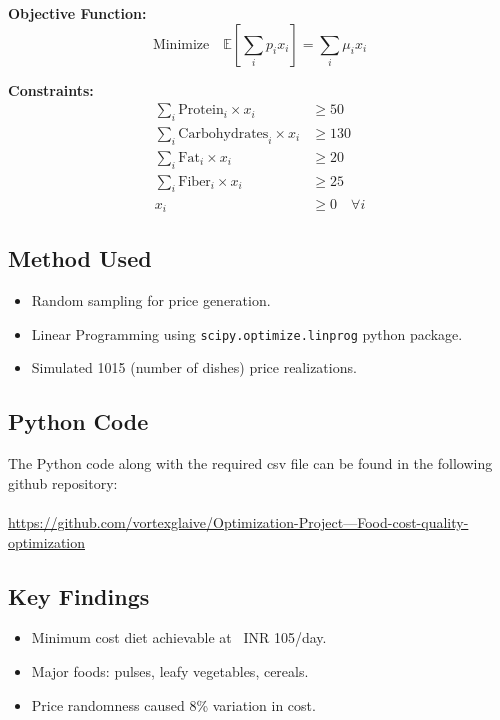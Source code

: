 \documentclass{article}
\begin{document}
\textbf{Objective Function:}
\[ \text{Minimize} \quad \mathbb{E} \left[ \sum_i p_i x_i \right] = \sum_i \mu_i x_i \]

\textbf{Constraints:}
\begin{align*}
\sum_i \text{Protein}_i \times x_i &\geq 50 \\
\sum_i \text{Carbohydrates}_i \times x_i &\geq 130 \\
\sum_i \text{Fat}_i \times x_i &\geq 20 \\
\sum_i \text{Fiber}_i \times x_i &\geq 25 \\
 x_i &\geq 0 \quad \forall i
\end{align*}

\subsection*{Method Used}
\begin{itemize}
    \item Random sampling for price generation.
    \item Linear Programming using \texttt{scipy.optimize.linprog} python package.
    \item Simulated 1015 (number of dishes) price realizations.
\end{itemize}

\subsection*{Python Code}
The Python code along with the required csv file can be found in the following github repository:\\
\\
\href{https://github.com/vortexglaive/Optimization-Project---Food-cost-quality-optimization}{https://github.com/vortexglaive/Optimization-Project---Food-cost-quality-optimization}


\subsection*{Key Findings}
\begin{itemize}
    \item Minimum cost diet achievable at ~INR 105/day.
    \item Major foods: pulses, leafy vegetables, cereals.
    \item Price randomness caused 8\% variation in cost.
\end{itemize}
\end{document}
